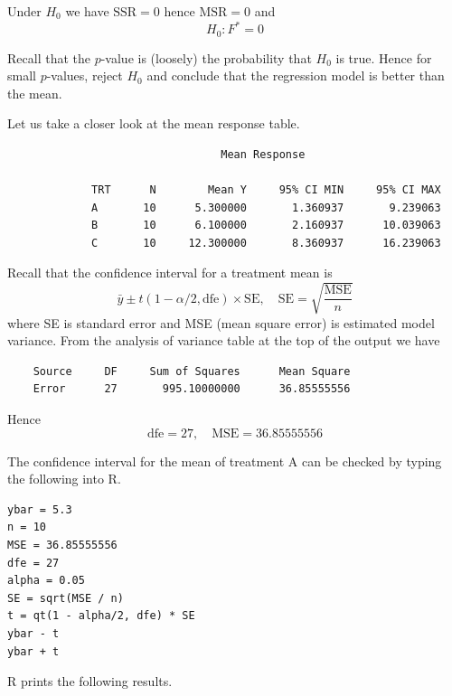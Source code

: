 \documentclass[12pt]{article}
\begin{document}
Under $H_0$ we have $\text{SSR}=0$ hence $\text{MSR}=0$ and
\begin{equation*}
H_0:F^*=0
\end{equation*}

Recall that the $p$-value is (loosely) the probability that $H_0$ is true.
Hence for small $p$-values, reject $H_0$ and conclude that the regression model is better than the mean.

\bigskip
Let us take a closer look at the mean response table.

{\footnotesize\begin{verbatim}
                                 Mean Response

             TRT      N        Mean Y     95% CI MIN     95% CI MAX
             A       10      5.300000       1.360937       9.239063
             B       10      6.100000       2.160937      10.039063
             C       10     12.300000       8.360937      16.239063
\end{verbatim}}

Recall that the confidence interval for a treatment mean is
\begin{equation*}
\bar y\pm t(1-\alpha/2,\text{dfe})\times\text{SE},
\quad
\text{SE}=\sqrt{\frac{\text{MSE}}{n}}
\end{equation*}
where SE is standard error and MSE (mean square error) is estimated model variance.
From the analysis of variance table at the top of the output we have

{\footnotesize\begin{verbatim}
    Source     DF     Sum of Squares      Mean Square
    Error      27       995.10000000      36.85555556
\end{verbatim}}

Hence
\begin{equation*}
\text{dfe}=27,
\quad
\text{MSE}=36.85555556
\end{equation*}

The confidence interval for the mean of treatment A can be checked by typing the following into R.

{\footnotesize\begin{verbatim}
ybar = 5.3
n = 10
MSE = 36.85555556
dfe = 27
alpha = 0.05
SE = sqrt(MSE / n)
t = qt(1 - alpha/2, dfe) * SE
ybar - t
ybar + t
\end{verbatim}}

R prints the following results.
\end{document}
